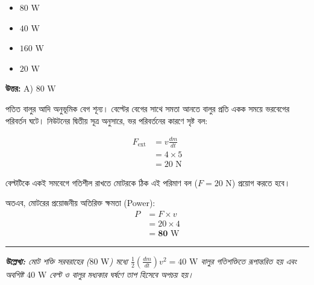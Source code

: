\documentclass[12pt, a4paper]{article}
\begin{document}
\begin{itemize}[label={}, leftmargin=1cm, itemsep=0.5em]
    \item[\textbf{A)}]  $80\text{ W}$
    \item[\textbf{B)}] $40\text{ W}$
    \item[\textbf{C)}]  $160\text{ W}$
    \item[\textbf{D)}]  $20\text{ W}$
\end{itemize}

\vspace{0.5em}
\begin{tcolorbox}[answerbox]
    \textbf{\color{success} উত্তর:} A) $80\text{ W}$
\end{tcolorbox}
\vspace{1em}

\begin{tcolorbox}[solutionbox={সমাধান (Solution)}]
    \noindent
    পতিত বালুর আদি অনুভূমিক বেগ শূন্য। বেল্টের বেগের সাথে সমতা আনতে বালুর প্রতি একক সময়ে ভরবেগের পরিবর্তন ঘটে। নিউটনের দ্বিতীয় সূত্র অনুসারে, ভর পরিবর্তনের কারণে সৃষ্ট বল:
    
    \begin{align*}
        F_{\text{ext}} &= v \frac{dm}{dt} \\
        &= 4 \times 5 \\
        &= 20\text{ N}
    \end{align*}
    
    বেল্টটিকে একই সমবেগে গতিশীল রাখতে মোটরকে ঠিক এই পরিমাণ বল ($F = 20\text{ N}$) প্রয়োগ করতে হবে। 
    
    অতএব, মোটরের প্রয়োজনীয় অতিরিক্ত ক্ষমতা (Power):
    \begin{align*}
        P &= F \times v \\
        &= 20 \times 4 \\
        &= \mathbf{80}\text{ W}
    \end{align*}
    
    \vspace{0.5em}
    \hrule
    \vspace{0.5em}
    \noindent\textit{\footnotesize \textbf{উল্লেখ্য:} মোট শক্তি সরবরাহের ($80\text{ W}$) মধ্যে $\frac{1}{2} \left(\frac{dm}{dt}\right) v^2 = 40\text{ W}$ বালুর গতিশক্তিতে রূপান্তরিত হয় এবং অবশিষ্ট $40\text{ W}$ বেল্ট ও বালুর মধ্যকার ঘর্ষণে তাপ হিসেবে অপচয় হয়।}
\end{tcolorbox}
\end{document}
